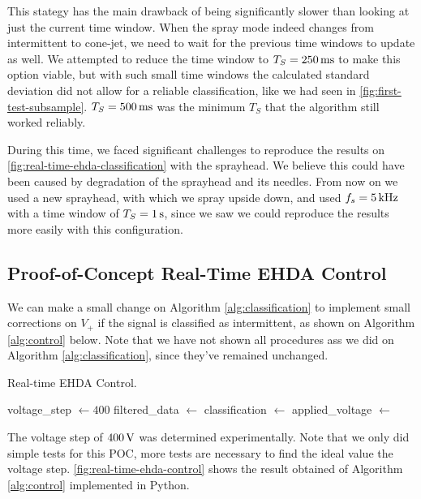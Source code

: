 \documentclass[oneside,12pt]{article}
\begin{document}
This stategy has the main drawback of being significantly slower than looking at just the current time window. When the spray 
mode indeed changes from intermittent to cone-jet, we need to wait for the previous time windows to update as well.
We attempted to reduce the time window to $T_S = 250 \,\mathrm{ms}$ to make this option viable, but with such small time
windows the calculated standard deviation did not allow for a reliable classification, 
like we had seen in \autoref{fig:first-test-subsample}. $T_S = 500 \,\mathrm{ms}$ was the minimum $T_S$ that the algorithm still worked
reliably.

During this time, we faced significant challenges to reproduce the results on 
\autoref{fig:real-time-ehda-classification} with the sprayhead. We believe this could have 
been caused by degradation of the sprayhead and its needles. From now on we used
a new sprayhead, with which we spray upside down, and used $f_s = 5 \,\mathrm{kHz}$ with a time
window of $T_S = 1 \,\mathrm{s}$, since we saw we could reproduce the results more easily 
with this configuration.

\subsection{Proof-of-Concept Real-Time EHDA Control}

We can make a small change on Algorithm \ref{alg:classification} to implement small corrections on $V_+$ if the signal 
is classified as intermittent, as shown on Algorithm \ref{alg:control} below. Note that we have not shown all procedures ass
we did on Algorithm \ref{alg:classification}, since they've remained unchanged.

\begin{algorithm}[h!]
    \caption{Real-time EHDA Control.}\label{alg:control}
    \begin{algorithmic}[1]
        \State voltage\_step $\gets 400$  
            \State filtered\_data $\gets$ 
            \State classification $\gets$ 
            \State applied\_voltage $\gets$ 

                \State {}
            \EndIf
        \EndWhile
    \end{algorithmic}
\end{algorithm}

The voltage step of $400 \,\mathrm{V}$ was determined experimentally. Note that we only did simple tests for this POC, more 
tests are necessary to find the ideal value the voltage step. \autoref{fig:real-time-ehda-control} shows the result 
obtained of Algorithm \ref{alg:control} implemented in Python.
\end{document}
